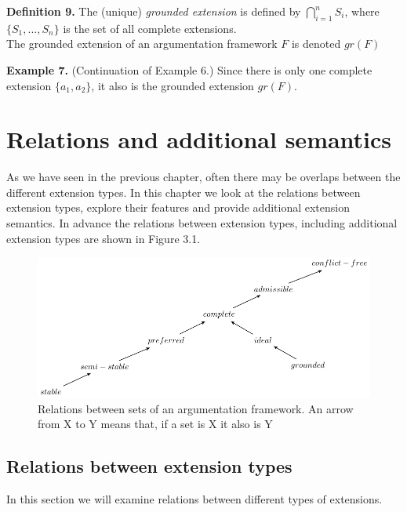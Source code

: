\documentclass[draft,final]{vutinfth} %
\newcommand{\hl}{\par\vspace{6pt}} %
\newcommand{\cl}{\par\vspace{12pt}} %
\begin{document}
\textbf{Definition 9.} The (unique) \emph{grounded extension} is defined by $\bigcap\limits_{i=1}^n{S_i}$, where $\{S_1,...,S_n\}$ is the set of all complete extensions.\\
The grounded extension of an argumentation framework $F$ is denoted $gr(F)$\cl

\textbf{Example 7.} (Continuation of Example 6.) Since there is only one complete extension $\{a_1,a_2\}$, it also is the grounded extension $gr(F)$.\cl

\chapter{Relations and additional semantics} %

As we have seen in the previous chapter, often there may be overlaps between the different extension types. In this chapter we look at the relations between extension types, explore their features and provide additional extension semantics. In advance the relations between extension types, including additional extension types are shown in Figure 3.1.\cl %

\FloatBarrier %
	\begin{figure}[!h]
		\centering
		\includegraphics[scale=1]{graphs/diagram_2.pdf}
		\caption{Relations between sets of an argumentation framework. An arrow from X to Y means that, if a set is X it also is Y}
	\end{figure}
\FloatBarrier

\section{Relations between extension types}
In this section we will examine relations between different types of extensions.\hl
\end{document}

